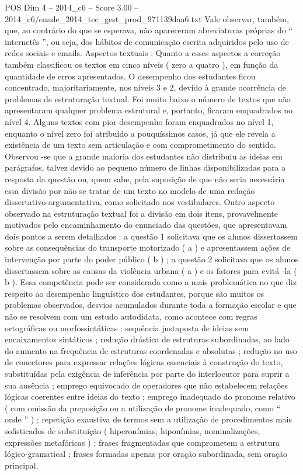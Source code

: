 \begin{textsample}{POS Dim 4 – 2014\_c6 – Score 3.00 – 2014\_c6/enade\_2014\_tec\_gest\_prod\_971139daa6.txt}
Vale observar, também, que, ao contrário do que se esperava, não apareceram abreviaturas próprias do “ internetês ”, ou seja, dos hábitos de comunicação escrita adquiridos pelo uso de redes sociais e emails.
Aspectos textuais : Quanto a esses aspectos a correção também classificou os textos em cinco níveis ( zero a quatro ), em função da quantidade de erros apresentados.
O desempenho dos estudantes ficou concentrado, majoritariamente, nos níveis 3 e 2, devido à grande ocorrência de problemas de estruturação textual.
Foi muito baixo o número de textos que não apresentaram qualquer problema estrutural e, portanto, ficaram enquadrados no nível 4.
Alguns textos com pior desempenho foram enquadrados no nível 1, enquanto o nível zero foi atribuído a pouquíssimos casos, já que ele revela a existência de um texto sem articulação e com comprometimento do sentido.
Observou -se que a grande maioria dos estudantes não distribuiu as ideias em parágrafos, talvez devido ao pequeno número de linhas disponibilizadas para a resposta da questão ou, quem sabe, pela suposição de que não seria necessária essa divisão por não se tratar de um texto no modelo de uma redação dissertativo-argumentativa, como solicitado nos vestibulares.
Outro aspecto observado na estruturação textual foi a divisão em dois itens, provavelmente motivados pelo encaminhamento do enunciado das questões, que apresentavam dois pontos a serem detalhados : a questão 1 solicitava que os alunos dissertassem sobre as consequências do transporte motorizado ( a ) e apresentassem ações de intervenção por parte do poder público ( b ) ; a questão 2 solicitava que os alunos dissertassem sobre as causas da violência urbana ( a ) e os fatores para evitá -la ( b ).
Essa competência pode ser considerada como a mais problemática no que diz respeito ao desempenho linguístico dos estudantes, porque são muitos os problemas observados, desvios acumulados durante toda a formação escolar e que não se resolvem com um estudo autodidata, como acontece com regras ortográficas ou morfossintáticas : sequência justaposta de ideias sem encaixamentos sintáticos ; redução drástica de estruturas subordinadas, ao lado do aumento na frequência de estruturas coordenadas e absolutas ; redução no uso de conectores para expressar relações lógicas essenciais à construção do texto, substituídas pela exigência de inferência por parte do interlocutor para suprir a sua ausência ; emprego equivocado de operadores que não estabelecem relações lógicas coerentes entre ideias do texto ; emprego inadequado do pronome relativo ( com omissão da preposição ou a utilização de pronome inadequado, como “ onde ” ) ; repetição exaustiva de termos sem a utilização de procedimentos mais sofisticados de substituição ( hiperonímias, hiponímias, nominalizações, expressões metafóricas ) ; frases fragmentadas que comprometem a estrutura lógico-gramatical ; frases formadas apenas por oração subordinada, sem oração principal.

\end{textsample}
